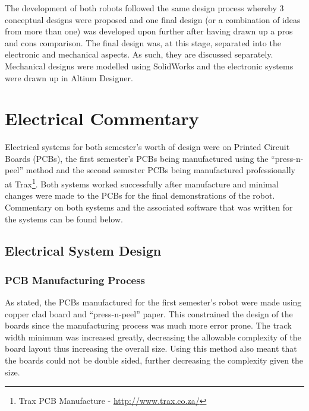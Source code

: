   The development of both robots followed the same design process whereby 3 conceptual designs were proposed and one final design (or a combination of ideas from more than one) was developed upon further after having drawn up a pros and cons comparison.  The final design was, at this stage, separated into the electronic and mechanical aspects.  As such, they are discussed separately.  Mechanical designs were modelled using SolidWorks and the electronic systems were drawn up in Altium Designer.

\clearpage
\section{Electrical Commentary}
\label{sec:Electrical Commentary}
  Electrical systems for both semester's worth of design were on Printed Circuit Boards (PCBs), the first semester's PCBs being manufactured using the ``press-n-peel'' method and the second semester PCBs being manufactured professionally at Trax\footnote{Trax PCB Manufacture - \url{http://www.trax.co.za/}}. Both systems worked successfully after manufacture and minimal changes were made to the PCBs for the final demonstrations of the robot. Commentary on both systems and the associated software that was written for the systems can be found below.

  \subsection{Electrical System Design}
  \label{sub:Electrical System Design}
    \subsubsection{PCB Manufacturing Process}
    \label{subs:PCB Manufacturing Process}
      As stated, the PCBs manufactured for the first semester's robot were made using copper clad board and ``press-n-peel'' paper. This constrained the design of the boards since the manufacturing process was much more error prone. The track width minimum was increased greatly, decreasing the allowable complexity of the board layout thus increasing the overall size. Using this method also meant that the boards could not be double sided, further decreasing the complexity given the size.\\

